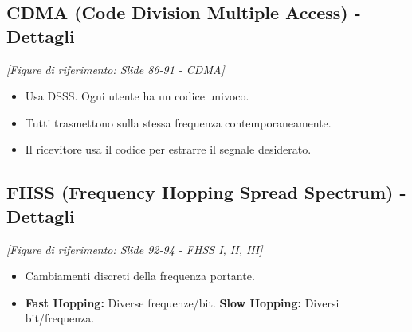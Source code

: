 \subsection{CDMA (Code Division Multiple Access) - Dettagli}
\textit{[Figure di riferimento: Slide 86-91 - CDMA]}
\begin{itemize}
    \item Usa DSSS. Ogni utente ha un codice univoco.
    \item Tutti trasmettono sulla stessa frequenza contemporaneamente.
    \item Il ricevitore usa il codice per estrarre il segnale desiderato.
\end{itemize}

\subsection{FHSS (Frequency Hopping Spread Spectrum) - Dettagli}
\textit{[Figure di riferimento: Slide 92-94 - FHSS I, II, III]}
\begin{itemize}
    \item Cambiamenti discreti della frequenza portante.
    \item \textbf{Fast Hopping:} Diverse frequenze/bit. \textbf{Slow Hopping:} Diversi bit/frequenza.
\end{itemize}

